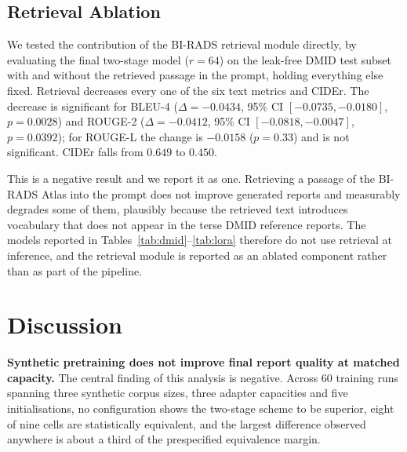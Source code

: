 \documentclass{wlscirep}
\begin{document}
\subsection*{Retrieval Ablation}

We tested the contribution of the BI-RADS retrieval module directly, by evaluating the final two-stage model ($r=64$) on the leak-free DMID test subset with and without the retrieved passage in the prompt, holding everything else fixed. Retrieval decreases every one of the six text metrics and CIDEr. The decrease is significant for BLEU-4 ($\Delta = -0.0434$, 95\% CI $[-0.0735, -0.0180]$, $p=0.0028$) and ROUGE-2 ($\Delta = -0.0412$, 95\% CI $[-0.0818, -0.0047]$, $p=0.0392$); for ROUGE-L the change is $-0.0158$ ($p=0.33$) and is not significant. CIDEr falls from $0.649$ to $0.450$.

This is a negative result and we report it as one. Retrieving a passage of the BI-RADS Atlas into the prompt does not improve generated reports and measurably degrades some of them, plausibly because the retrieved text introduces vocabulary that does not appear in the terse DMID reference reports. The models reported in Tables~\ref{tab:dmid}--\ref{tab:lora} therefore do not use retrieval at inference, and the retrieval module is reported as an ablated component rather than as part of the pipeline.

\section*{Discussion}

\textbf{Synthetic pretraining does not improve final report quality at matched capacity.} The central finding of this analysis is negative. Across 60 training runs spanning three synthetic corpus sizes, three adapter capacities and five initialisations, no configuration shows the two-stage scheme to be superior, eight of nine cells are statistically equivalent, and the largest difference observed anywhere is about a third of the prespecified equivalence margin.
\end{document}
